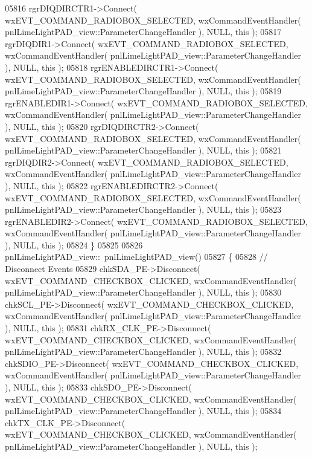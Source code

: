 \begin{DoxyCode}
05816     rgrDIQDIRCTR1->Connect( wxEVT\_COMMAND\_RADIOBOX\_SELECTED, wxCommandEventHandler( 
      pnlLimeLightPAD_view::ParameterChangeHandler ), NULL, \textcolor{keyword}{this} );
05817     rgrDIQDIR1->Connect( wxEVT\_COMMAND\_RADIOBOX\_SELECTED, wxCommandEventHandler( 
      pnlLimeLightPAD_view::ParameterChangeHandler ), NULL, \textcolor{keyword}{this} );
05818     rgrENABLEDIRCTR1->Connect( wxEVT\_COMMAND\_RADIOBOX\_SELECTED, wxCommandEventHandler( 
      pnlLimeLightPAD_view::ParameterChangeHandler ), NULL, \textcolor{keyword}{this} );
05819     rgrENABLEDIR1->Connect( wxEVT\_COMMAND\_RADIOBOX\_SELECTED, wxCommandEventHandler( 
      pnlLimeLightPAD_view::ParameterChangeHandler ), NULL, \textcolor{keyword}{this} );
05820     rgrDIQDIRCTR2->Connect( wxEVT\_COMMAND\_RADIOBOX\_SELECTED, wxCommandEventHandler( 
      pnlLimeLightPAD_view::ParameterChangeHandler ), NULL, \textcolor{keyword}{this} );
05821     rgrDIQDIR2->Connect( wxEVT\_COMMAND\_RADIOBOX\_SELECTED, wxCommandEventHandler( 
      pnlLimeLightPAD_view::ParameterChangeHandler ), NULL, \textcolor{keyword}{this} );
05822     rgrENABLEDIRCTR2->Connect( wxEVT\_COMMAND\_RADIOBOX\_SELECTED, wxCommandEventHandler( 
      pnlLimeLightPAD_view::ParameterChangeHandler ), NULL, \textcolor{keyword}{this} );
05823     rgrENABLEDIR2->Connect( wxEVT\_COMMAND\_RADIOBOX\_SELECTED, wxCommandEventHandler( 
      pnlLimeLightPAD_view::ParameterChangeHandler ), NULL, \textcolor{keyword}{this} );
05824 \}
05825 
05826 pnlLimeLightPAD_view::~pnlLimeLightPAD_view()
05827 \{
05828     \textcolor{comment}{// Disconnect Events}
05829     chkSDA_PE->Disconnect( wxEVT\_COMMAND\_CHECKBOX\_CLICKED, wxCommandEventHandler( 
      pnlLimeLightPAD_view::ParameterChangeHandler ), NULL, \textcolor{keyword}{this} );
05830     chkSCL_PE->Disconnect( wxEVT\_COMMAND\_CHECKBOX\_CLICKED, wxCommandEventHandler( 
      pnlLimeLightPAD_view::ParameterChangeHandler ), NULL, \textcolor{keyword}{this} );
05831     chkRX_CLK_PE->Disconnect( wxEVT\_COMMAND\_CHECKBOX\_CLICKED, wxCommandEventHandler( 
      pnlLimeLightPAD_view::ParameterChangeHandler ), NULL, \textcolor{keyword}{this} );
05832     chkSDIO_PE->Disconnect( wxEVT\_COMMAND\_CHECKBOX\_CLICKED, wxCommandEventHandler( 
      pnlLimeLightPAD_view::ParameterChangeHandler ), NULL, \textcolor{keyword}{this} );
05833     chkSDO_PE->Disconnect( wxEVT\_COMMAND\_CHECKBOX\_CLICKED, wxCommandEventHandler( 
      pnlLimeLightPAD_view::ParameterChangeHandler ), NULL, \textcolor{keyword}{this} );
05834     chkTX_CLK_PE->Disconnect( wxEVT\_COMMAND\_CHECKBOX\_CLICKED, wxCommandEventHandler( 
      pnlLimeLightPAD_view::ParameterChangeHandler ), NULL, \textcolor{keyword}{this} );

\end{DoxyCode}
